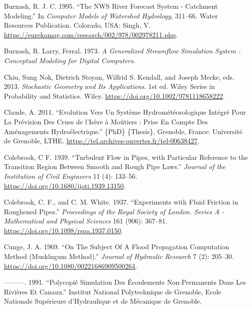 \documentclass[
  letterpaper,
  DIV=11,
  numbers=noendperiod]{scrreprt}
\newlength{\cslhangindent}
\newlength{\cslentryspacingunit} %
\newenvironment{CSLReferences}[2] %
 {%
  \setlength{\parindent}{0pt}
  \ifodd #1
  \let\oldpar\par
  \def\par{\hangindent=\cslhangindent\oldpar}
  \fi
  \setlength{\parskip}{#2\cslentryspacingunit}
 }%
 {}
\begin{document}
\begin{CSLReferences}{1}{0}
\leavevmode{}%
Burnash, R. J. C. 1995. {``The {NWS} {River} {Forecast} {System} -
Catchment Modeling.''} In \emph{Computer Models of Watershed Hydrology},
311--66. Water {Resources} {Publication}. Colorado, USA: Singh, V.
\url{https://eurekamag.com/research/002/978/002978211.php}.

\leavevmode{}%
Burnash, R. Larry, Ferral. 1973. \emph{A Generalized Streamflow
Simulation System : Conceptual Modeling for Digital Computers}.

\leavevmode{}%
Chiu, Sung Nok, Dietrich Stoyan, Wilfrid S. Kendall, and Joseph Mecke,
eds. 2013. \emph{Stochastic {Geometry} and Its {Applications}}. 1st ed.
Wiley {Series} in {Probability} and {Statistics}. Wiley.
\url{https://doi.org/10.1002/9781118658222}.

\leavevmode{}%
Claude, A. 2011. {``Evolution Vers Un Système Hydrométéorologique
Intégré Pour La Prévision Des Crues de l'{Isère} à {Moûtiers} : Prise En
Compte Des Aménagements Hydroélectrique.''} \{PhD\} \{Thesis\},
Grenoble, France: Université de Grenoble, LTHE.
\url{https://tel.archives-ouvertes.fr/tel-00638427}.

\leavevmode{}%
Colebrook, C F. 1939. {``Turbulent Flow in Pipes, with Particular
Reference to the Transition Region Between Smooth and Rough Pipe
Laws.''} \emph{Journal of the Institution of Civil Engineers} 11 (4):
133--56. \url{https://doi.org/10.1680/ijoti.1939.13150}.

\leavevmode{}%
Colebrook, C. F., and C. M. White. 1937. {``Experiments with Fluid
Friction in Roughened Pipes.''} \emph{Proceedings of the Royal Society
of London. Series A - Mathematical and Physical Sciences} 161 (906):
367--81. \url{https://doi.org/10.1098/rspa.1937.0150}.

\leavevmode{}%
Cunge, J. A. 1969. {``On {The} {Subject} {Of} {A} {Flood} {Propagation}
{Computation} {Method} ({Musklngum} {Method}).''} \emph{Journal of
Hydraulic Research} 7 (2): 205--30.
\url{https://doi.org/10.1080/00221686909500264}.

\leavevmode{}%
---------. 1991. {``Polycopié {Simulation} Des Écoulements
Non-Permanents Dans Les Rivières Et Canaux.''} Institut National
Polytechnique de Grenoble, Ecole Nationale Supérieure d'Hydraulique et
de Mécanique de Grenoble.


\end{CSLReferences}
\end{document}
